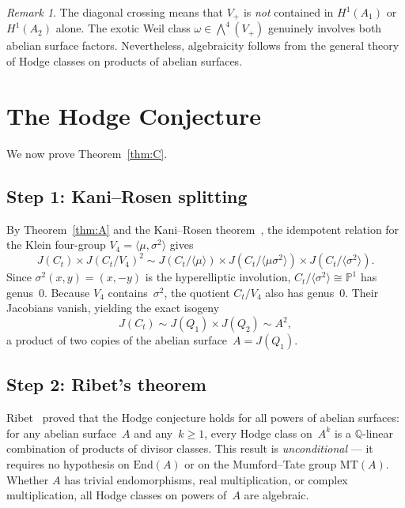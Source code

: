 \documentclass[11pt]{article}
\theoremstyle{plain}
\theoremstyle{definition}
\theoremstyle{remark}
\newtheorem{remark}[theorem]{Remark}
\newcommand{\Q}{\mathbb{Q}}
\newcommand{\End}{\mathrm{End}}
\newcommand{\MT}{\mathrm{MT}}
\begin{document}
\begin{remark}\label{rmk:diagonal}
The diagonal crossing means that $V_+$ is \emph{not} contained in
$H^1(A_1)$ or $H^1(A_2)$ alone.  The exotic Weil class
$\omega \in \bigwedge^4(V_+)$ genuinely involves both abelian surface
factors.  Nevertheless, algebraicity follows from the general theory
of Hodge classes on products of abelian surfaces.
\end{remark}

\section{The Hodge Conjecture}
\label{sec:hodge}

We now prove Theorem~\ref{thm:C}.

\subsection{Step 1: Kani--Rosen splitting}

By Theorem~\ref{thm:A} and the Kani--Rosen theorem~\cite{KR89},
the idempotent relation for the Klein four-group
$V_4 = \langle \mu, \sigma^2 \rangle$ gives
\[
  J(C_t) \times J(C_t/V_4)^2
  \sim J(C_t/\langle\mu\rangle) \times J(C_t/\langle\mu\sigma^2\rangle)
       \times J(C_t/\langle\sigma^2\rangle).
\]
Since $\sigma^2(x,y) = (x,-y)$ is the hyperelliptic involution,
$C_t/\langle\sigma^2\rangle \cong \mathbb{P}^1$ has genus~0.
Because $V_4$ contains~$\sigma^2$, the quotient $C_t/V_4$ also
has genus~0.  Their Jacobians vanish, yielding the exact isogeny
\[
  J(C_t) \sim J(Q_1) \times J(Q_2) \sim A^2,
\]
a product of two copies of the abelian surface~$A = J(Q_1)$.

\subsection{Step 2: Ribet's theorem}

Ribet~\cite{Ribet83} proved that the Hodge conjecture holds for
all powers of abelian surfaces: for any abelian surface~$A$ and
any~$k \geq 1$, every Hodge class on~$A^k$ is a $\Q$-linear
combination of products of divisor classes.  This result is
\emph{unconditional} --- it requires no hypothesis on $\End(A)$
or on the Mumford--Tate group $\MT(A)$.  Whether $A$ has trivial
endomorphisms, real multiplication, or complex multiplication,
all Hodge classes on powers of~$A$ are algebraic.
\end{document}

